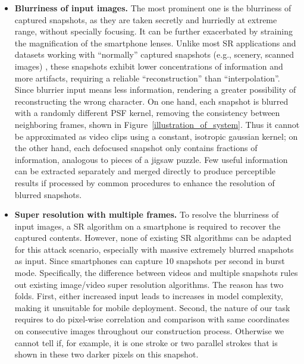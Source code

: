 \begin{itemize}[leftmargin=*]
  \item \textbf{Blurriness of input images.} The most prominent one is the blurriness of captured snapshots, as they are taken secretly and hurriedly at extreme range, without specially focusing. It can be further exacerbated by straining the magnification of the smartphone lenses. Unlike most SR applications and datasets working with ``normally'' captured snapshots (e.g., scenery, scanned images) \cite{nasrollahi2020deep,lyn2020image}, these snapshots exhibit lower concentrations of information and more artifacts, requiring a reliable ``reconstruction'' than ``interpolation''. Since blurrier input means less information, rendering a greater possibility of reconstructing the wrong character.
  On one hand, each snapshot is blurred with a randomly different PSF kernel, removing the consistency between neighboring frames, shown in Figure~\ref{illustration_of_system}. Thus it cannot be approximated as video clips using a constant, isotropic gaussian kernel; on the other hand, each defocused snapshot only contains fractions of information, analogous to pieces of a jigsaw puzzle.
  Few useful information can be extracted separately and merged directly to produce perceptible results if processed by common procedures to enhance the resolution of blurred snapshots. 
  \item \textbf{Super resolution with multiple frames.} To resolve the blurriness of input images, a SR algorithm on a smartphone is required to recover the captured contents. However, none of existing SR algorithms can be adapted for this attack scenario, especially with massive extremely blurred snapshots as input. Since smartphones can capture 10 snapshots per second in burst mode. Specifically, the difference between videos and multiple snapshots rules out existing image/video super resolution algorithms. The reason has two folds. First, either increased input leads to increases in model complexity, making it unsuitable for mobile deployment. Second, the nature of our task requires to do pixel-wise correlation and comparison with same coordinates on consecutive images throughout our construction process. Otherwise we cannot tell if, for example, it is one stroke or two parallel strokes that is shown in these two darker pixels on this snapshot.

\end{itemize}
